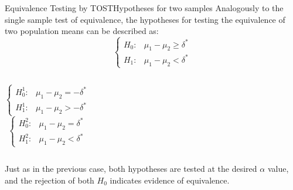 \begin{frame}{Equivalence Testing by TOST}{Hypotheses for two samples}
Analogously to the single sample test of equivalence, the hypotheses for testing the equivalence of two population means can be described as:
\begin{equation*}
\begin{cases}
H_0: &\mu_1-\mu_2 \geq\delta^*\\
H_1: &\mu_1-\mu_2 <\delta^*
\end{cases}
\end{equation*}
\hrulefill

\begin{columns}[T]
\begin{equation*}
\begin{cases}
H_0^1: &\mu_1-\mu_2 = -\delta^*\\
H_1^1: &\mu_1-\mu_2 > -\delta^*
\end{cases}
\end{equation*}
\begin{equation*}
\begin{cases}
H_0^2: &\mu_1-\mu_2 = \delta^*\\
H_1^2: &\mu_1-\mu_2 < \delta^*
\end{cases}
\end{equation*}
\end{columns}
\bigskip

Just as in the previous case, both hypotheses are tested at the desired $\alpha$ value, and the rejection of both $H_0$ indicates evidence of equivalence.
\end{frame}



%
%
%
%

